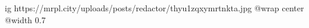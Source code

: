  
 
 
 
 

\ifcmt
  ig https://mrpl.city/uploads/posts/redactor/thyu1zqxymrtnkta.jpg
  @wrap center
  @width 0.7
\fi
